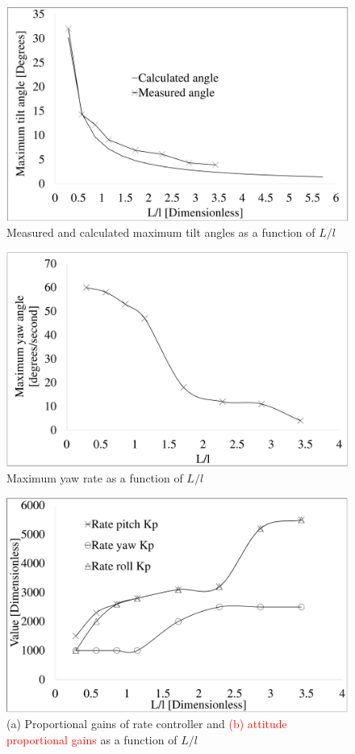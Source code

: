 \documentclass[12pt,a4paper]{article}
\begin{document}
\begin{figure}[h!]
\centering
 \includegraphics[scale=0.3]{TiltAngle_2.pdf}
  \caption{Measured and calculated maximum tilt angles as a function of $L/l$}
  \label{fig11}
\end{figure}

\begin{figure}[h!]
\centering
 \includegraphics[scale=0.3]{Yawrate.pdf}
  \caption{Maximum yaw rate as a function of $L/l$}
  \label{fig12}
\end{figure}

\begin{figure}[h!]
\centering
 \includegraphics[scale=0.3]{Rate_PID.pdf}
  \caption{(a) Proportional gains of rate controller and \textcolor{red}{(b) attitude proportional gains} as a function of $L/l$}
  \label{fig13}
\end{figure}
\end{document}
